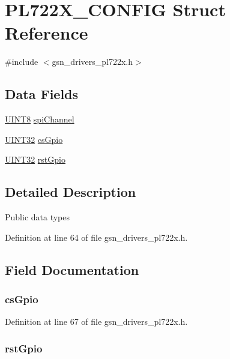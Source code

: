 \hypertarget{a00449}{
\section{PL722X\_\-CONFIG Struct Reference}
\label{a00449}
}


{\ttfamily \#include $<$gsn\_\-drivers\_\-pl722x.h$>$}

\subsection*{Data Fields}
\begin{DoxyCompactItemize}
\item 
\hyperlink{a00660_gab27e9918b538ce9d8ca692479b375b6a}{UINT8} \hyperlink{a00449_a83a2309a5073ea257cf95ec84fa387e5}{spiChannel}
\item 
\hyperlink{a00660_gae1e6edbbc26d6fbc71a90190d0266018}{UINT32} \hyperlink{a00449_adfd676373ff6b4e1bd5139216f79ebe5}{csGpio}
\item 
\hyperlink{a00660_gae1e6edbbc26d6fbc71a90190d0266018}{UINT32} \hyperlink{a00449_a09beb351c65ecd0d64c843a49a29e215}{rstGpio}
\end{DoxyCompactItemize}


\subsection{Detailed Description}
Public data types 

Definition at line 64 of file gsn\_\-drivers\_\-pl722x.h.



\subsection{Field Documentation}
\hypertarget{a00449_adfd676373ff6b4e1bd5139216f79ebe5}{
\subsubsection[{csGpio}]{ {\bf csGpio}}}
\label{a00449_adfd676373ff6b4e1bd5139216f79ebe5}


Definition at line 67 of file gsn\_\-drivers\_\-pl722x.h.

\hypertarget{a00449_a09beb351c65ecd0d64c843a49a29e215}{
\subsubsection[{rstGpio}]{ {\bf rstGpio}}}
\label{a00449_a09beb351c65ecd0d64c843a49a29e215}


